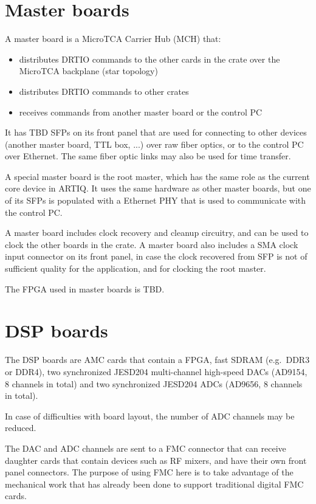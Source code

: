 \documentclass[11pt]{paper}
\begin{document}
\section{Master boards}
A master board is a MicroTCA Carrier Hub (MCH) that:
\begin{itemize}
\item distributes DRTIO commands to the other cards in the crate over the MicroTCA backplane (star topology)
\item distributes DRTIO commands to other crates
\item receives commands from another master board or the control PC
\end{itemize}

It has TBD SFPs on its front panel that are used for connecting to other devices (another master board, TTL box, ...) over raw fiber optics, or to the control PC over Ethernet. The same fiber optic links may also be used for time transfer.

A special master board is the root master, which has the same role as the current core device in ARTIQ. It uses the same hardware as other master boards, but one of its SFPs is populated with a Ethernet PHY that is used to communicate with the control PC.

A master board includes clock recovery and cleanup circuitry, and can be used to clock the other boards in the crate. A master board also includes a SMA clock input connector on its front panel, in case the clock recovered from SFP is not of sufficient quality for the application, and for clocking the root master.

The FPGA used in master boards is TBD.

\section{DSP boards}
The DSP boards are AMC cards that contain a FPGA, fast SDRAM (e.g.\ DDR3 or DDR4), two synchronized JESD204 multi-channel high-speed DACs (AD9154, 8 channels in total) and two synchronized JESD204 ADCs (AD9656, 8 channels in total).

In case of difficulties with board layout, the number of ADC channels may be reduced.

The DAC and ADC channels are sent to a FMC connector that can receive daughter cards that contain devices such as RF mixers, and have their own front panel connectors. The purpose of using FMC here is to take advantage of the mechanical work that has already been done to support traditional digital FMC cards.
\end{document}

